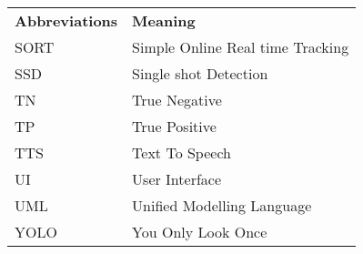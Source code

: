 		\break
			\begin{table}[h]
				\begin{center}
					\begin{tabular}{l l}
						\textbf{Abbreviations} & \textbf{Meaning} \\
						SORT & Simple Online Real time Tracking \\
						SSD & Single shot Detection \\
						TN & True Negative \\
						TP & True Positive \\
						TTS & Text To Speech \\
						UI & User Interface \\
						UML & Unified Modelling Language \\
						YOLO & You Only Look Once\\
					\end{tabular}	
				\end{center}
			\end{table}
		\break
		\pagebreak
		
	